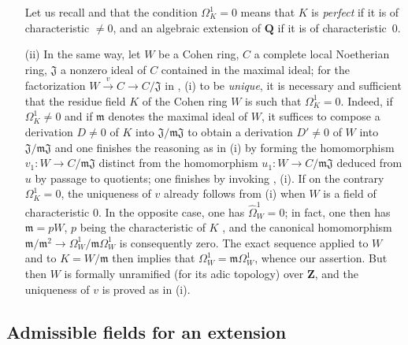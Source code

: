 \begin{remarks}[21.5.3]
\begin{enumerate}
    Let us recall  and  that the condition $\Omega^1_K=0$ means that $K$ is \emph{perfect} if it is of characteristic $\neq 0$, and an algebraic extension of $\mathbf{Q}$ if it is of characteristic~$0$.
  \item[(ii)] In the same way, let $W$ be a Cohen ring, $C$ a complete local Noetherian ring, $\mathfrak{J}$ a nonzero ideal of $C$ contained in the maximal ideal; for the factorization $W\xrightarrow{v} C\to C/\mathfrak{J}$ in , (i) to be \emph{unique}, it is necessary and sufficient that the residue field $K$ of the Cohen ring $W$ is such that $\Omega^1_K=0$.
    Indeed, if $\Omega^1_K\neq 0$ and if $\mathfrak{m}$ denotes the maximal ideal of $W$, it suffices to compose a derivation $D\neq 0$ of $K$ into $\mathfrak{J}/\mathfrak{m}\mathfrak{J}$ to obtain a derivation $D'\neq 0$ of $W$ into $\mathfrak{J}/\mathfrak{m}\mathfrak{J}$ and one finishes the reasoning as in (i) by forming the homomorphism $v_1:W\to C/\mathfrak{m}\mathfrak{J}$ distinct from the homomorphism $u_1:W\to C/\mathfrak{m}\mathfrak{J}$ deduced from $u$ by passage to quotients; one finishes by invoking , (i).
    If on the contrary $\Omega^1_K=0$, the uniqueness of $v$ already follows from (i) when $W$ is a field of characteristic $0$.
    In the opposite case, one has $\widehat{\Omega}^1_W=0$; in fact, one then has $\mathfrak{m}=pW$, $p$ being the characteristic of $K$ , and the canonical homomorphism $\mathfrak{m}/\mathfrak{m}^2\to\Omega^1_W/\mathfrak{m}\Omega^1_W$  is consequently zero. The exact sequence  applied to $W$ and to $K=W/\mathfrak{m}$ then implies that $\Omega^1_W=\mathfrak{m}\Omega^1_W$, whence our assertion.
    But then  $W$ is formally unramified (for its adic topology) over $\mathbf{Z}$, and the uniqueness of $v$ is proved as in (i).
\end{enumerate}
\end{remarks}

\subsection{Admissible fields for an extension}
\label{subsection:0.21.6}

